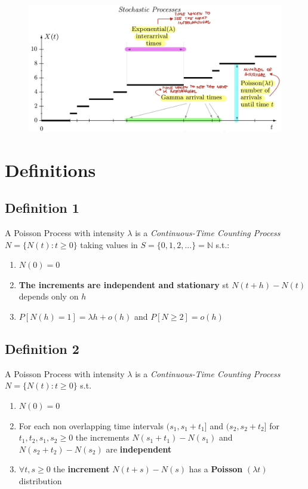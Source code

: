 \begin{figure}[h]
\begin{center}
\includegraphics[width=1\linewidth]{images/poisson_process.jpeg}
\end{center}
\end{figure}

\section{Definitions}
\subsection{Definition 1}
A Poisson Process with intensity $\lambda$ is a \textit{Continuous-Time Counting Process} $N=\{N(t): t \geq 0\}$ taking values in $S = \{0,1,2,...\} = \mathbb{N}$ s.t.:
\begin{enumerate}
    \item $N(0) = 0$
    \item \textbf{The increments are independent and stationary} st $N(t+h) - N(t)$ depends only on $h$
    \item $P[N(h) = 1] = \lambda h + o(h)$ and $P[N \geq 2] = o(h)$
\end{enumerate}

\subsection{Definition 2}
A Poisson Process with intensity $\lambda$ is a \textit{Continuous-Time Counting Process} $N=\{N(t): t \geq 0\}$ s.t.
\begin{enumerate}
    \item $N(0) = 0$
    \item For each non overlapping time intervals $(s_1, s_1+t_1]$ and $(s_2, s_2+t_2]$ for $t_1,t_2,s_1,s_2 \geq 0$ the increments $N(s_1+t_1) - N(s_1)$ and $N(s_2+t_2) - N(s_2)$ are \textbf{independent}
    \item $\forall t,s \geq 0$ the \textbf{increment} $N(t+s) - N(s)$ has a \textbf{Poisson} $(\lambda t)$ distribution
\end{enumerate}

